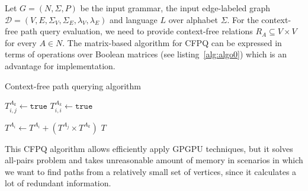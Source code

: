 Let $G = (N, \Sigma, P)$ be the input grammar, the input edge-labeled graph $\mathcal{D} = (V, E, \Sigma_V, \Sigma_E, \lambda_V, \lambda_E)$ and language $L$ over alphabet $\Sigma$. For the context-free path query evaluation, we need to provide context-free relations \mbox{$R_A \subseteq V \times V$} for every \mbox{$A \in N$}.
The matrix-based algorithm for CFPQ can be expressed in terms of operations over Boolean matrices (see listing~\ref{alg:algo0}) which is an advantage for implementation.
{\footnotesize
\begin{algorithm}
\begin{algorithmic}[1]
\caption{Context-free path querying algorithm}
\label{alg:algo0}
          {$T^{A_k}_{i,j} \gets \texttt{true}$}
    \EndFor
            {$T^{A_k}_{i,i} \gets \texttt{true}$}
        \EndFor
    \EndFor

          { $T^{A_i} \gets T^{A_i} + (T^{A_j} \times T^{A_k})$ } 
        \EndFor
    \EndWhile
\State \Return $T$
\EndFunction
\end{algorithmic}
\end{algorithm}
}

This CFPQ algorithm allows efficiently apply GPGPU techniques, but it solves all-pairs problem and takes unreasonable amount of memory in scenarios in which we want to find paths from a relatively small set of vertices, since it calculates a lot of redundant information.  